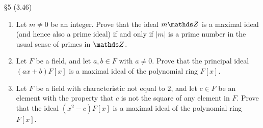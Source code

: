 \documentclass{homework}
\begin{document}
\begin{problem}{\S 5}
  (3.46)
  \begin{enumerate}[label=(\alph*)]
    \item Let $m\neq 0$ be an integer. Prove that the ideal $m\Z$ is a maximal ideal (and hence also
      a prime ideal) if and only if $\left| m \right| $ is a prime number in the usual sense of
      primes in $\Z$.
    \item Let $F$ be a field, and let $a,b\in F$ with $a\neq 0$. Prove that the principal ideal
      $(ax+b)F[x]$ is a maximal ideal of the polynomial ring $F[x]$.
    \item Let $F$ be a field with characteristic not equal to $2$, and let $c\in F$ be an element
      with the property that $c$ is not the square of any element in $F$. Prove that the ideal
      $(x^2-c)F[x]$ is a maximal ideal of the polynomial ring $F[x]$.
  \end{enumerate}
\end{problem}
\end{document}
